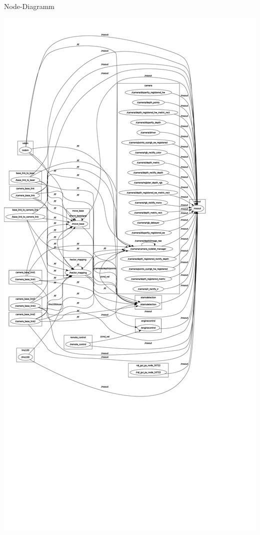 \documentclass[18pt]{beamer}
\begin{document}
\begin{frame}{Node-Diagramm}
\begin{center}
	\includegraphics[scale=0.05]{images/rosgraph_hmmwv.pdf}
\end{center}
\end{frame}
\end{document}

